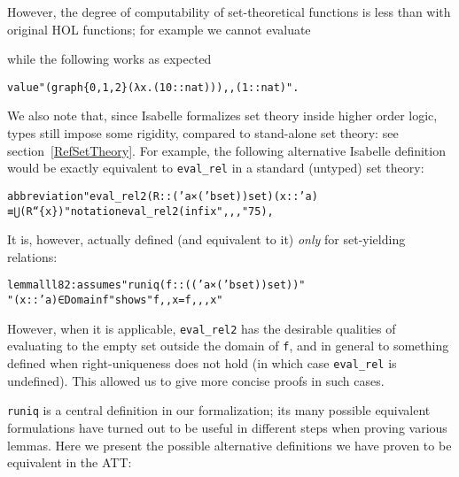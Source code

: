 \documentclass[
]{llncs}
\newenvironment{mytable}{
\vspace{0.2ex}
\begin{center}\begin{minipage}
{0.9\textwidth}\renewcommand{\baselinestretch}{0.75}\begin{small}}
{\end{small}\end{minipage}\end{center}
\vspace{0.1ex}
}
\newcommand{\att}{ATT}
\newcommand{\hol}{higher order logic}
\newcommand{\I}{Isabelle}
\begin{document}
However, the degree of computability of set-theoretical functions is less than with original HOL functions; for example we cannot evaluate
\begin{small}

\end{small}

\noindent while the following works as expected
\begin{mytable}
\begin{alltt}
value "(graph \{0,1,2\} (λx. (10::nat))),,(1::nat)".
\end{alltt}
\end{mytable}

We also note that, since Isabelle formalizes set theory inside \hol{}, types still impose some rigidity, compared to stand-alone set theory: see section~\ref{RefSetTheory}.
For example, the following alternative \I{} definition would be exactly equivalent to \verb|eval_rel| in a standard (untyped) set theory:
\label{RefEvalRel2}
\begin{mytable}
\begin{alltt}
abbreviation "eval_rel2 (R::('a×('b set)) set) (x::'a) 
≡ ⋃ (R``\{x\})" notation eval_rel2 (infix ",,," 75),
\end{alltt}\end{mytable}
It is, however, actually defined (and equivalent to it) \emph{only} for set-yielding relations:
\begin{mytable}
\begin{alltt}
lemma lll82: assumes "runiq (f::(('a × ('b set)) set))"
"(x::'a) ∈ Domain f" shows "f,,x = f,,,x"
\end{alltt}
\end{mytable}
However, when it is applicable, \verb|eval_rel2| has the desirable qualities of evaluating to the empty set outside the domain of \verb|f|, and in general to something defined when right-uniqueness does not hold (in which case \verb|eval_rel| is undefined).
This allowed us to give more concise proofs in such cases.



\verb|runiq| is a central definition in our formalization; its many possible equivalent formulations have 
turned out to be useful in different steps when proving various lemmas.
Here we present the possible alternative definitions we have proven to be equivalent in the \att{}: 
\end{document}

